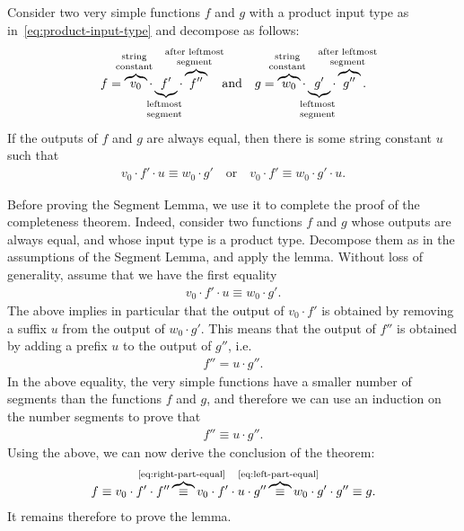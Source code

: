 \begin{lemma}\label{lem:segment-lemma}
    Consider two very simple functions $f$ and $g$ with a product input type as in~\eqref{eq:product-input-type}
    and decompose  as follows:
\begin{align*}
f = \myoverbrace{v_0}{string\\ constant} \cdot  \myunderbrace{f'}{leftmost\\ segment} \cdot \myoverbrace{f''}{after leftmost \\ segment}  \quad \text{and} \quad 
g = \myoverbrace{w_0}{string\\ constant} \cdot \myunderbrace{g'}{leftmost\\ segment} \cdot \myoverbrace{g''}{after leftmost \\ segment}.
\end{align*}
If the outputs of $f$ and $g$ are always equal, then there is some string constant $u$ such that 
\begin{align*}
v_0 \cdot f' \cdot u \equiv w_0 \cdot g' 
\quad \text{or} \quad v_0 \cdot f' \equiv w_0 \cdot g' \cdot u.
\end{align*}
\end{lemma}

Before proving the Segment Lemma, we use it to complete the proof of the completeness theorem. Indeed, consider two functions $f$ and $g$ whose outputs are always equal, and whose input type is a product type. Decompose them as in the assumptions of the Segment Lemma, and apply the lemma. Without loss of generality, assume that we have the first equality 
\begin{align}\label{eq:left-part-equal}
v_0 \cdot f' \cdot u \equiv w_0 \cdot g'.
\end{align}
The above implies in particular that the output of $v_0 \cdot f'$ is obtained by removing a suffix $u$ from the output of $w_0 \cdot g'$. This means that the output of $f''$ is obtained by adding a prefix $u$ to the output of $g''$, i.e.~
\begin{align*}
f'' = u \cdot g''.
\end{align*}
In the above equality, the very simple functions have a smaller number of segments than the functions $f$ and $g$, and therefore we can use an induction on the number segments to prove that 
\begin{align}\label{eq:right-part-equal}
f'' \equiv u \cdot g''.
\end{align}
Using the above, we can now derive the conclusion of the theorem:
\begin{align*}
f  \equiv  v_0 \cdot f' \cdot f'' 
\myoverbrace{\equiv}{\eqref{eq:right-part-equal}}  v_0 \cdot f' \cdot u \cdot g'' 
\myoverbrace{\equiv}{\eqref{eq:left-part-equal}} w_0 \cdot g' \cdot g'' \equiv g.
\end{align*} 
 It remains therefore to prove the lemma.

